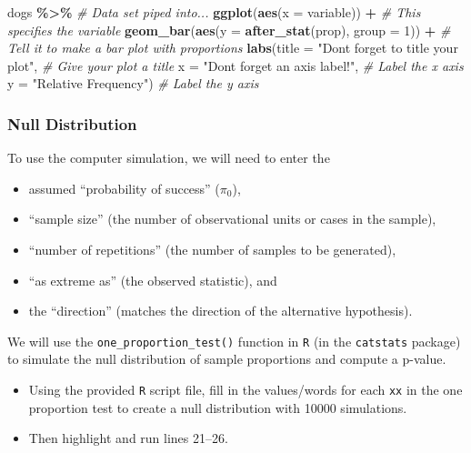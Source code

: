 \documentclass[
]{report}
\newenvironment{Shaded}{\begin{snugshade}}{\end{snugshade}}
\newcommand{\AttributeTok}[1]{\textcolor[rgb]{0.13,0.29,0.53}{#1}}
\newcommand{\CommentTok}[1]{\textcolor[rgb]{0.56,0.35,0.01}{\textit{#1}}}
\newcommand{\DecValTok}[1]{\textcolor[rgb]{0.00,0.00,0.81}{#1}}
\newcommand{\FunctionTok}[1]{\textcolor[rgb]{0.13,0.29,0.53}{\textbf{#1}}}
\newcommand{\NormalTok}[1]{#1}
\newcommand{\SpecialCharTok}[1]{\textcolor[rgb]{0.81,0.36,0.00}{\textbf{#1}}}
\newcommand{\StringTok}[1]{\textcolor[rgb]{0.31,0.60,0.02}{#1}}
\begin{document}
\begin{Shaded}
\begin{Highlighting}[]
\NormalTok{dogs }\SpecialCharTok{\%\textgreater{}\%} \CommentTok{\# Data set piped into...}
    \FunctionTok{ggplot}\NormalTok{(}\FunctionTok{aes}\NormalTok{(}\AttributeTok{x =}\NormalTok{ variable)) }\SpecialCharTok{+}   \CommentTok{\# This specifies the variable}
    \FunctionTok{geom\_bar}\NormalTok{(}\FunctionTok{aes}\NormalTok{(}\AttributeTok{y =} \FunctionTok{after\_stat}\NormalTok{(prop), }\AttributeTok{group =} \DecValTok{1}\NormalTok{)) }\SpecialCharTok{+}  \CommentTok{\# Tell it to make a bar plot with proportions}
    \FunctionTok{labs}\NormalTok{(}\AttributeTok{title =} \StringTok{"Don\textquotesingle{}t forget to title your plot"}\NormalTok{,  }
       \CommentTok{\# Give your plot a title}
       \AttributeTok{x =} \StringTok{"Don\textquotesingle{}t forget an axis label!"}\NormalTok{,   }\CommentTok{\# Label the x axis}
       \AttributeTok{y =} \StringTok{"Relative Frequency"}\NormalTok{)  }\CommentTok{\# Label the y axis}
\end{Highlighting}
\end{Shaded}

\subsubsection*{Null Distribution}\label{null-distribution}

To use the computer simulation, we will need to enter the

\begin{itemize}
\item
  assumed ``probability of success'' (\(\pi_0\)),
\item
  ``sample size'' (the number of observational units or cases in the sample),
\item
  ``number of repetitions'' (the number of samples to be generated),
\item
  ``as extreme as'' (the observed statistic), and
\item
  the ``direction'' (matches the direction of the alternative hypothesis).
\end{itemize}

We will use the \texttt{one\_proportion\_test()} function in \texttt{R} (in the \texttt{catstats} package) to simulate the null distribution of sample proportions and compute a p-value.

\begin{itemize}
\item
  Using the provided \texttt{R} script file, fill in the values/words for each \texttt{xx} in the one proportion test to create a null distribution with 10000 simulations.
\item
  Then highlight and run lines 21--26.
\end{itemize}
\end{document}
